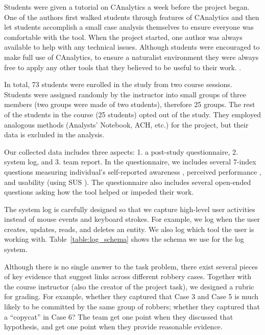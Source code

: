 Students were given a tutorial on CAnalytics a week before the project began. One of the authors first walked students through features of CAnalytics and then let students accomplish a small case analysis themselves to ensure everyone was comfortable with the tool. When the project started, one author was always available to help with any technical issues. Although students were encouraged to make full use of CAnalytics, to ensure a naturalist environment they were always free to apply any other tools that they believed to be useful to their work. . 

In total, 73 students were enrolled in the study from two course sessions. Students were assigned randomly by the instructor into small groups of three members (two groups were made of two students), therefore 25 groups. The rest of the students in the course (25 students) opted out of the study. They employed analogous methods (Analysts' Notebook, ACH, etc.) for the project, but their data is excluded in the analysis.



Our collected data includes three aspects: 1. a post-study questionnaire, 2. system log, and 3. team report. In the questionnaire, we includes several 7-index questions measuring individual's self-reported awareness \cite{Convertino2011}, perceived performance \cite{Goyal2014}, and usability (using SUS \cite{}). The questionnaire also includes several open-ended questions asking how the tool helped or impeded their work. 

The system log is carefully designed so that we capture high-level user activities instead of mouse events and keyboard strokes. For example, we log when the user creates, updates, reads, and deletes an entity. We also log which tool the user is working with. Table~\ref{table:log_schema} shows the schema we use for the log system.  

Although there is no single answer to the task problem, there exist several pieces of key evidence that suggest links across different robbery cases. Together with the course instructor (also the creator of the project task), we designed a rubric for grading. For example, whether they captured that Case 3 and Case 5 is much likely to be committed by the same group of robbers; whether they captured that a ``copycat'' in Case 6? The team get one point when they discussed that hypothesis, and get one point when they provide reasonable evidence.

